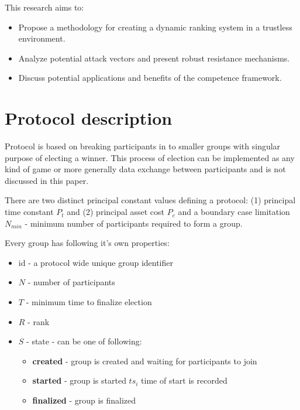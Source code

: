\documentclass{article}
\begin{document}
\begin{CJK}{UTF8}{gbsn}
    This research aims to:

    \begin{itemize}[nosep]
        \item Propose a methodology for creating a dynamic ranking system in a trustless environment.
        \item Analyze potential attack vectors and present robust resistance mechanisms.
        \item Discuss potential applications and benefits of the competence framework.
    \end{itemize}

    \section{Protocol description}

    Protocol is based on breaking participants in to smaller groups with singular purpose of electing a winner. This process of election can be implemented as any kind of game or more generally data exchange between participants and is not discussed in this paper.

    There are two distinct principal constant values defining a protocol: (1) principal time constant $P_t$ and (2) principal asset cost $P_c$ and a boundary case limitation $N_{min}$ - minimum number of participants required to form a group.

    Every group has following it's own properties:
    \begin{itemize}[nosep]
        \item id - a protocol wide unique group identifier
        \item $N$ - number of participants
        \item $T$ - minimum time to finalize election
        \item $R$ - rank
        \item $S$ -  state - can be one of following:
              \begin{itemize}[nosep]
                  \item \textbf{created} - group is created and waiting for participants to join
                  \item \textbf{started} - group is started $ts_i$ time of start is recorded
                  \item \textbf{finalized} - group is finalized
              \end{itemize}
    \end{itemize}



\end{CJK}
\end{document}
